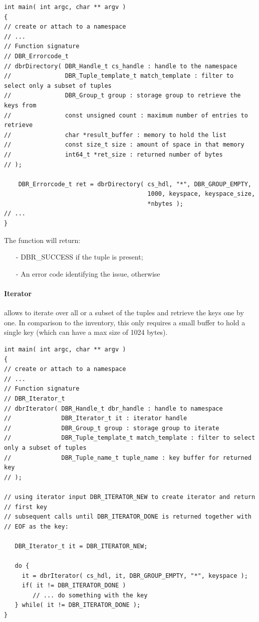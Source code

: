 \begin{lstlisting}[style=mystyle,basicstyle=\scriptsize\ttfamily,caption=List
  the currently available tuples., label=code:dbrDirectory]
int main( int argc, char ** argv )
{
// create or attach to a namespace
// ...
// Function signature
// DBR_Errorcode_t
// dbrDirectory( DBR_Handle_t cs_handle : handle to the namespace
//               DBR_Tuple_template_t match_template : filter to select only a subset of tuples
//               DBR_Group_t group : storage group to retrieve the keys from
//               const unsigned count : maximum number of entries to retrieve
//               char *result_buffer : memory to hold the list
//               const size_t size : amount of space in that memory
//               int64_t *ret_size : returned number of bytes
// );

	DBR_Errorcode_t ret = dbrDirectory( cs_hdl, "*", DBR_GROUP_EMPTY,
                                        1000, keyspace, keyspace_size,
                                        *nbytes );
// ...
}
\end{lstlisting}


The function will return:
\begin{itemize}
	\item[-] DBR\_SUCCESS if the tuple is present;
	\item[-] An error code identifying the issue, otherwise
\end{itemize}



\paragraph{Iterator} allows to iterate over all or a subset of the
tuples and retrieve the keys one by one.  In comparison to the
inventory, this only requires a small buffer to hold a single key
(which can have a max size of 1024 bytes).

\begin{lstlisting}[style=mystyle,basicstyle=\scriptsize\ttfamily,caption=List
  the currently available tuples., label=code:dbrIterator]
int main( int argc, char ** argv )
{
// create or attach to a namespace
// ...
// Function signature
// DBR_Iterator_t
// dbrIterator( DBR_Handle_t dbr_handle : handle to namespace
//              DBR_Iterator_t it : iterator handle
//              DBR_Group_t group : storage group to iterate
//              DBR_Tuple_template_t match_template : filter to select only a subset of tuples
//              DBR_Tuple_name_t tuple_name : key buffer for returned key
// );

// using iterator input DBR_ITERATOR_NEW to create iterator and return
// first key
// subsequent calls until DBR_ITERATOR_DONE is returned together with
// EOF as the key:

   DBR_Iterator_t it = DBR_ITERATOR_NEW;

   do {
     it = dbrIterator( cs_hdl, it, DBR_GROUP_EMPTY, "*", keyspace );
     if( it != DBR_ITERATOR_DONE )
        // ... do something with the key
   } while( it != DBR_ITERATOR_DONE );
}
\end{lstlisting}

